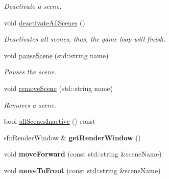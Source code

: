 \begin{DoxyCompactItemize}
\begin{DoxyCompactList}\small\item\em Deactivate a scene. \end{DoxyCompactList}\item 
\mbox{\label{classzt_1_1_scene_manager_a6afb9d6bd8ff0b537d55128fbd9be96a}} 
void \hyperlink{classzt_1_1_scene_manager_a6afb9d6bd8ff0b537d55128fbd9be96a}{deactivate\+All\+Scenes} ()
\begin{DoxyCompactList}\small\item\em Deactivates all scenes, thus, the game loop will finish. \end{DoxyCompactList}\item 
void \hyperlink{classzt_1_1_scene_manager_ac8864d3586a8fa7ce01a7c5c007dd5e7}{pause\+Scene} (std\+::string name)
\begin{DoxyCompactList}\small\item\em Pauses the scene. \end{DoxyCompactList}\item 
\mbox{\label{classzt_1_1_scene_manager_a5e7367b8f8bc358a974220e9ae58ab0a}} 
void \hyperlink{classzt_1_1_scene_manager_a5e7367b8f8bc358a974220e9ae58ab0a}{remove\+Scene} (std\+::string name)
\begin{DoxyCompactList}\small\item\em Removes a scene. \end{DoxyCompactList}\item 
bool \hyperlink{classzt_1_1_scene_manager_a9b84c499ed47c2f58ef6e7ea8edba296}{all\+Scenes\+Inactive} () const
\item 
\mbox{\label{classzt_1_1_scene_manager_a3a0edba9daf3e9fe063b621dc39310c9}} 
sf\+::\+Render\+Window \& {\bfseries get\+Render\+Window} ()
\item 
\mbox{\label{classzt_1_1_scene_manager_a44481a7e109706c111c38c985d9caedb}} 
void {\bfseries move\+Forward} (const std\+::string \&scene\+Name)
\item 
\mbox{\label{classzt_1_1_scene_manager_aeed45624540e6b59e5ae0f78468b4f29}} 
void {\bfseries move\+To\+Front} (const std\+::string \&scene\+Name)
\item 
\mbox{\label{classzt_1_1_scene_manager_a8caa94629a100ae3db366b10f76f7c54}} 

\end{DoxyCompactItemize}
